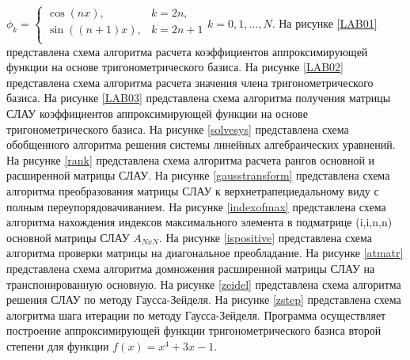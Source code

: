 $\phi_k=\left\{
{\begin{array}{ll}
\cos{(nx)},& k=2n,\\
\sin{((n+1)x)},&k=2n+1\\
\end{array}
}\right. k=0,1,...,N.$
На рисунке \ref{LAB01} представлена схема алгоритма расчета коэффициентов аппроксимирующей функции на основе тригонометрического базиса.
На рисунке \ref{LAB02} представлена схема алгоритма расчета значения члена тригонометрического базиса.
На рисунке \ref{LAB03} представлена схема алгоритма получения матрицы СЛАУ  коэффициентов аппроксимирующей функции на основе тригонометрического базиса.
На рисунке \ref{solvesys} представлена схема обобщенного алгоритма решения системы линейных алгебраических уравнений.
На рисунке \ref{rank} представлена схема алгоритма расчета рангов основной и расширенной матрицы СЛАУ.
На рисунке \ref{gausstransform} представлена схема алгоритма преобразования матрицы СЛАУ к верхнетрапециедальному виду с полным переупорядовачиванием.
На рисунке \ref{indexofmax} представлена схема алгоритма нахождения индексов максимального элемента в подматрице (i,i,n,n) основной матрицы СЛАУ $A_{NxN}$.
На рисунке \ref{ispositive} представлена схема алгоритма проверки матрицы на диагональное преобладание.
На рисунке \ref{atmatr} представлена схема алгоритма домножения расширенной матрицы СЛАУ на транспонированную основную.
На рисунке \ref{zeidel} представлена схема алгоритма решения СЛАУ по методу Гаусса-Зейделя.
На рисунке \ref{zstep} представлена схема алогритма шага итерации по методу Гаусса-Зейделя.
\clearpage
{}
Программа осуществляет построение аппроксимирующей функции тригонометрического базиса второй степени для функции $f(x)=x^4+3x-1$.

